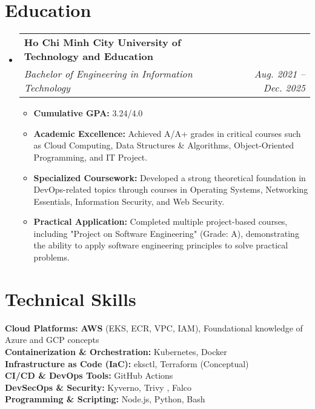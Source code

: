 \documentclass[a4paper,12pt]{article}
\makeatletter
\newcommand{\resumeItem}[1]{
  \item\small{
    {#1 \vspace{-2pt}}
  }
}
\newcommand{\resumeSubheading}[4]{
  \vspace{-2pt}\item
    \begin{tabular*}{0.97\textwidth}[t]{l@{\extracolsep{\fill}}r}
      \textbf{#1} & #2 \\
      \textit{\small#3} & \textit{\small #4} \\
    \end{tabular*}\vspace{-7pt}
}
\newcommand{\resumeSubHeadingListStart}{\begin{itemize}[leftmargin=0.15in, label={}]}
\newcommand{\resumeSubHeadingListEnd}{\end{itemize}}
\newcommand{\resumeItemListStart}{\begin{itemize}}
\newcommand{\resumeItemListEnd}{\end{itemize}\vspace{-5pt}}
\makeatother
\begin{document}
\section{Education}
\resumeSubHeadingListStart
\resumeSubheading
{Ho Chi Minh City University of Technology and Education}{}
{Bachelor of Engineering in Information Technology}{Aug. 2021 -- Dec. 2025}
\resumeItemListStart
\resumeItem{\textbf{Cumulative GPA:} 3.24/4.0}
\resumeItem{\textbf{Academic Excellence:} Achieved A/A+ grades in critical courses such as Cloud Computing, Data Structures \& Algorithms, Object-Oriented Programming, and IT Project.}
\resumeItem{\textbf{Specialized Coursework:} Developed a strong theoretical foundation in DevOps-related topics through courses in Operating Systems, Networking Essentials, Information Security, and Web Security.}
\resumeItem{\textbf{Practical Application:} Completed multiple project-based courses, including "Project on Software Engineering" (Grade: A), demonstrating the ability to apply software engineering principles to solve practical problems.
}
\resumeItemListEnd
\resumeSubHeadingListEnd



%
\section{Technical Skills}
\begin{itemize}[leftmargin=0.15in, label={}]
  \small{\item{
        \textbf{Cloud Platforms:}{ \textbf{AWS} (EKS, ECR, VPC, IAM), Foundational knowledge of Azure and GCP concepts} \\
        \textbf{Containerization \& Orchestration:}{ Kubernetes, Docker} \\
        \textbf{Infrastructure as Code (IaC):}{  eksctl, Terraform (Conceptual)} \\
        \textbf{CI/CD \& DevOps Tools:}{  GitHub Actions} \\
        \textbf{DevSecOps \& Security:}{  Kyverno, Trivy , Falco
} \\
        \textbf{Programming \& Scripting:}{ Node.js, Python, Bash} 
        }}
\end{itemize}


\end{document}
